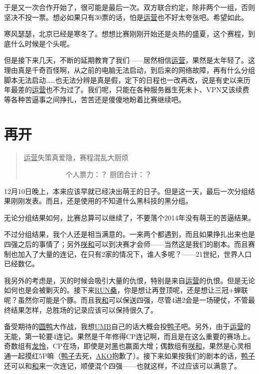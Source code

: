 于是又一次合作开始了，很可能是最后一次。双方联合约定，除非两个一组，否则坚决不投一票。想必如果只有30票的话，怕是\uline{运营}也不好太夸张吧。希望如此。

寒风瑟瑟，北京已经是寒冬了。想想比赛刚刚开始还是炎热的盛夏，这个赛程，到底什么时候是个头呢。

但是接下来几天，不断的延期教育了我们——居然相信\uline{运营}，果然是太年轻了。这理由真是千奇百怪啊，从之前的电脑无法启动，到后来的网络故障，再有什么分组脚本无法启动……也无法分辨是真是假，定下的日程也一改再改，说是有史以来历年最差的\uline{运营}也不为过了。我们呢，只能在各种服务器生死未卜、VPN又该续费等各种苦逼事之间挣扎，苦苦还是傻傻地盼着比赛继续吧。

\chapter{再开}
\begin{quote}
\uline{运营}失策真爱隐，赛程混乱大厨烦

　　　　　　个人票力：？ 厨团合计：？
\end{quote}

12月10日晚上，本来应该早就已经决出萌王的日子。但是这一天，最后一次分组结果刚刚发表。而且，还是使用的不知道什么黑科技的黑分组。

无论分组结果如何，比赛总算可以继续了，不要落个2014年没有萌王的苦逼结果。

不过分组结果，我个人还是相当满意的。一来两个都遇到，而且如果挣扎出来也是四强之后的事情了；另外\uline{咲}\uline{和}可以到决赛才会师——当然这是我们的剧本。而且赛制也加入了大量的连记，在只有2家的情况下，谁人多呢？——21世纪，世界人口已经数亿。

我另外的考虑是，灭的时候会吸引大量的仇恨，特别是来自\uline{运营}的仇恨。但是无论如何也是会被剿灭的。接下来\uline{RUN桑}，你是想让再登顶呢，还是想让三冠+蝉联呢？虽然你可能是个豚。而且我\uline{和}可以保送四强，尽管4进2会是一场硬仗，不管最终结果怎样，总胜场的记录应该可以保持很久了。

备受期待的\uline{圆}\uline{鸭}大作战，我想\uline{UMB}自己的话大概会投\uline{鸭子}吧。另外，由于\uline{运营}的无能，第一轮要4连记。果然是千年修得CP连记啊，而且是在这么重要的赛场上。奇数组有\uline{龙}\uline{怜}，CP在场，即使是对\uline{黑}也赢面大增；偶数组有\uline{咲}\uline{和}，果然是心灵相通一起摸红5P嘛（\uline{鸭子}去死，\uline{AKO}抱歉了）。接下来如果按我们的剧本的话，\uline{鸭子}还可以和\uline{和}来一次连记，顺便混个四强——也就这样，不过应该可以满意了。

